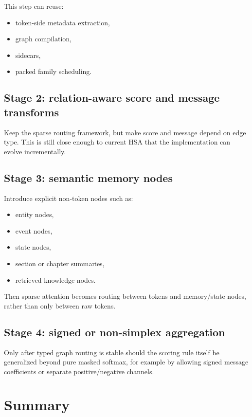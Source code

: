 \documentclass[11pt]{article}
\begin{document}
This step can reuse:
\begin{itemize}[leftmargin=1.5em]
    \item token-side metadata extraction,
    \item graph compilation,
    \item sidecars,
    \item packed family scheduling.
\end{itemize}

\subsection{Stage 2: relation-aware score and message transforms}

Keep the sparse routing framework, but make score and message depend on edge
type. This is still close enough to current HSA that the implementation can
evolve incrementally.

\subsection{Stage 3: semantic memory nodes}

Introduce explicit non-token nodes such as:
\begin{itemize}[leftmargin=1.5em]
    \item entity nodes,
    \item event nodes,
    \item state nodes,
    \item section or chapter summaries,
    \item retrieved knowledge nodes.
\end{itemize}

Then sparse attention becomes routing between tokens and memory/state nodes,
rather than only between raw tokens.

\subsection{Stage 4: signed or non-simplex aggregation}

Only after typed graph routing is stable should the scoring rule itself be
generalized beyond pure masked softmax, for example by allowing signed message
coefficients or separate positive/negative channels.

\section{Summary}
\end{document}
